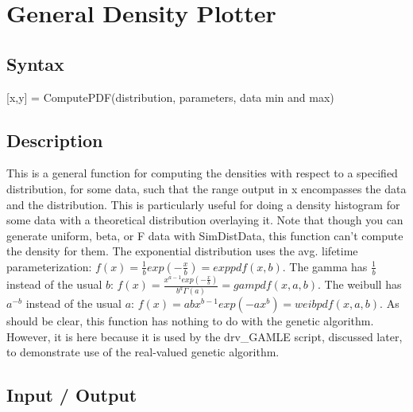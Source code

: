 \documentclass{book}
\newcommand{\textcode}[1]{\textsf{\small #1}}   %
\begin{document}
\section{General Density Plotter}

\subsection*{Syntax}

\textcode{[x,y] = ComputePDF(distribution, parameters, data min and
max)}

\subsection*{Description}

This is a general function for computing the densities with respect
to a specified distribution, for some data, such that the range
output in x encompasses the data and the distribution. This is
particularly useful for doing a density histogram for some data with
a theoretical distribution overlaying it. Note that though you can
generate uniform, beta, or F data with \textcode{SimDistData}, this
function can't compute the density for them. The exponential
distribution uses the avg. lifetime
parameterization: $f\left( x\right) =\frac{1}{b}exp\left( -\frac{x}{b}%
\right) =exppdf(x,b)$. The gamma has $\frac{1}{b}$ instead of the
usual $b$: $f\left( x\right) =\frac{x^{a-1}exp\left(
-\frac{x}{b}\right) }{b^{a}\Gamma \left( a\right) }=gampdf(x,a,b)$.
The weibull has $a^{-b}$ instead of the usual $a$: $f\left( x\right)
=abx^{b-1}exp(-ax^{b})=weibpdf(x,a,b)$. As should be clear, this
function has nothing to do with the genetic algorithm. However, it
is here because it is used by the \textcode{drv\_GAMLE} script,
discussed later, to demonstrate use of the real-valued genetic
algorithm.

\subsection*{Input / Output}
\end{document}
